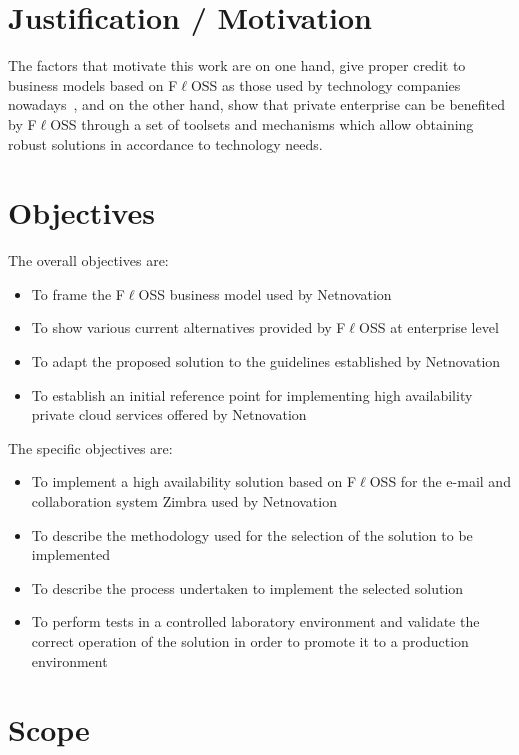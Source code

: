 \documentclass[a4paper, 12pt]{book}
\begin{document}
\section{Justification / Motivation}
\label{sec:justification}

The factors that motivate this work are on one hand, give proper credit to business models based on F$\ell$OSS as those used by technology companies nowadays~\cite{Daffara2}, and on the other hand, show that private enterprise can be benefited by F$\ell$OSS  through a set of toolsets and mechanisms which allow obtaining robust solutions in accordance to technology needs.

\section{Objectives}
\label{sec:objectives}

The overall objectives are:

\begin{itemize}
	\item To frame the F$\ell$OSS business model used by Netnovation
	\item To show various current alternatives provided by F$\ell$OSS at enterprise level
	\item To adapt the proposed solution to the guidelines established by Netnovation
	\item To establish an initial reference point for implementing high availability private cloud services offered by Netnovation
\end{itemize}

\noindent The specific objectives are:

\begin{itemize}
	\item To implement a high availability solution based on F$\ell$OSS for the e-mail and collaboration system Zimbra used by Netnovation
	\item To describe the methodology used for the selection of the solution to be implemented
	\item To describe the process undertaken to implement the selected solution
	\item To perform tests in a controlled laboratory environment and validate the correct operation of the solution in order to promote it to a production environment
\end{itemize}


\section{Scope}
\label{sec:scope}
\end{document}
